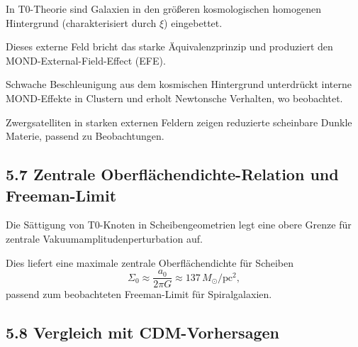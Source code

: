 	In T0-Theorie sind Galaxien in den größeren kosmologischen homogenen Hintergrund (charakterisiert durch $\xi$) eingebettet.
	
	Dieses externe Feld bricht das starke Äquivalenzprinzip und produziert den MOND-External-Field-Effect (EFE).
	
	Schwache Beschleunigung aus dem kosmischen Hintergrund unterdrückt interne MOND-Effekte in Clustern und erholt Newtonsche Verhalten, wo beobachtet.
	
	Zwergsatelliten in starken externen Feldern zeigen reduzierte scheinbare Dunkle Materie, passend zu Beobachtungen.
	
	\subsection{5.7 Zentrale Oberflächendichte-Relation und Freeman-Limit}
	
	Die Sättigung von T0-Knoten in Scheibengeometrien legt eine obere Grenze für zentrale Vakuumamplitudenperturbation auf.
	
	Dies liefert eine maximale zentrale Oberflächendichte für Scheiben
	\[
	\Sigma_0 \approx \frac{a_0}{2\pi G} \approx 137 \, M_\odot / \text{pc}^2,
	\]
	passend zum beobachteten Freeman-Limit für Spiralgalaxien.
	
	\subsection{5.8 Vergleich mit CDM-Vorhersagen}
	
	\begin{table}[htbp]
		\centering
		\caption{Vorhersagen auf galaktischer Skala}
		\label{tab:galaktisch}
	\end{table}
	

